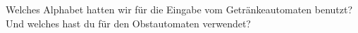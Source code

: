%
%
Welches Alphabet hatten wir für die Eingabe vom Getränkeautomaten benutzt? Und welches hast du für den Obstautomaten verwendet?\\

\blank[width=\linewidth]{}
